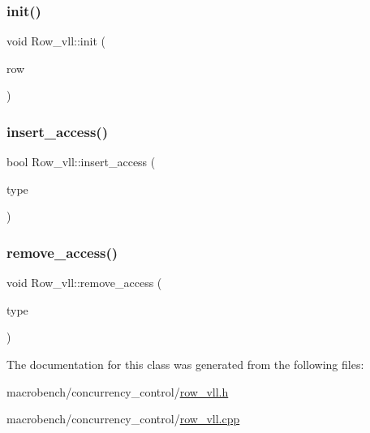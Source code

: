 \subsubsection{\texorpdfstring{init()}{init()}}
{\footnotesize\ttfamily void Row\+\_\+vll\+::init (\begin{DoxyParamCaption}\item[{\hyperlink{classrow__t}{row\+\_\+t} $\ast$}]{row }\end{DoxyParamCaption})}

\mbox{\label{classRow__vll_a35de5541a336e6c59ec3858e43d6cf71}} 
\subsubsection{\texorpdfstring{insert\+\_\+access()}{insert\_access()}}
{\footnotesize\ttfamily bool Row\+\_\+vll\+::insert\+\_\+access (\begin{DoxyParamCaption}\item[{\hyperlink{global_8h_a567f81b0ae33b00d189d7714e9fde0bc}{access\+\_\+t}}]{type }\end{DoxyParamCaption})}

\mbox{\label{classRow__vll_a9a5897c79cbccb910326d48b274a8fc4}} 
\subsubsection{\texorpdfstring{remove\+\_\+access()}{remove\_access()}}
{\footnotesize\ttfamily void Row\+\_\+vll\+::remove\+\_\+access (\begin{DoxyParamCaption}\item[{\hyperlink{global_8h_a567f81b0ae33b00d189d7714e9fde0bc}{access\+\_\+t}}]{type }\end{DoxyParamCaption})}



The documentation for this class was generated from the following files\+:\begin{DoxyCompactItemize}
\item 
macrobench/concurrency\+\_\+control/\hyperlink{row__vll_8h}{row\+\_\+vll.\+h}\item 
macrobench/concurrency\+\_\+control/\hyperlink{row__vll_8cpp}{row\+\_\+vll.\+cpp}\end{DoxyCompactItemize}
